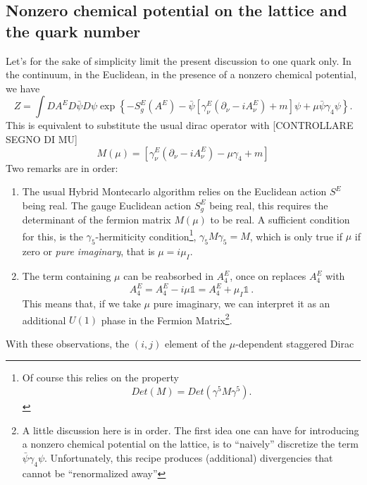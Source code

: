 \subsection{Nonzero chemical potential on the lattice and the quark number}

Let's for the sake of simplicity limit the present discussion to one quark only. In the 
continuum, in the Euclidean, in the presence of a nonzero chemical potential, we have 
\begin{equation}
 Z = \int DA^E D\bar{\psi}D \psi \exp{\left\{-S_g^E(A^E) - \bar{\psi}\left[ 
\gamma_\nu^E \left( \partial_\nu - i A_\nu^E \right) + m \right]\psi + \mu \bar{\psi} 
\gamma_4 \psi \right\} }.
\end{equation}
This is equivalent to substitute the usual dirac operator with [CONTROLLARE SEGNO DI MU]
\begin{equation}
 M(\mu) = \left[ \gamma_\nu^E \left( \partial_\nu - i A_\nu^E \right) - \mu \gamma_4 
+ m \right]
\end{equation}
Two remarks are in order: 
\begin{enumerate}
 \item The usual Hybrid Montecarlo algorithm relies on the Euclidean action $S^E$ being 
real. The gauge Euclidean action $S_g^E$ being real, this requires the determinant of 
the fermion matrix $M(\mu)$ to be real. A sufficient condition for this, is the 
$\gamma_5$-hermiticity condition\footnote{Of course this relies on the property 
\begin{equation}
 Det(M) = Det(\gamma^5 M \gamma^5) . \nonumber
\end{equation}
}, 
$\gamma_5 M \gamma_5 = M$, which is only true if $\mu$ if zero or \emph{pure 
imaginary}, that is $\mu = i \mu_I$.
 \item The term containing $\mu$ can be reabsorbed in $A_4^E$, once on replaces $A_4^E$ 
with
\begin{equation}
 A_4^E = A_4^E - i \mu \mathbb{1} =  A_4^E + \mu_I \mathbb{1} \ . 
\end{equation}
This means that, if we take $\mu$ pure imaginary, we can interpret it as an additional 
$U(1)$ phase in the Fermion Matrix\footnote{
A little discussion here is in order. The first idea one can have for introducing a 
nonzero chemical potential on the lattice, is to ``naively'' discretize the term
$\bar{\psi}\gamma_4\psi$. Unfortunately, this recipe produces (additional) divergencies 
that cannot be ``renormalized away''}. 
\end{enumerate}
With these observations, the $(i,j)$ element of the $\mu$-dependent staggered Dirac 
